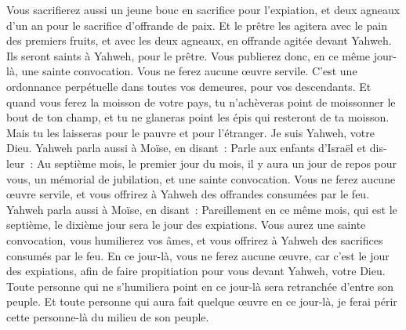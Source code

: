 \begin{multicols}{2}
Vous sacrifierez aussi un jeune bouc en sacrifice pour l'expiation, et deux agneaux d'un an pour le sacrifice d'offrande de paix.
Et le prêtre les agitera avec le pain des premiers fruits, et avec les deux agneaux, en offrande agitée devant Yahweh. Ils seront saints à Yahweh, pour le prêtre.
Vous publierez donc, en ce même jour-là, une sainte convocation. Vous ne ferez aucune œuvre servile. C'est une ordonnance perpétuelle dans toutes vos demeures, pour vos descendants.
Et quand vous ferez la moisson de votre pays, tu n'achèveras point de moissonner le bout de ton champ, et tu ne glaneras point les épis qui resteront de ta moisson. Mais tu les laisseras pour le pauvre et pour l'étranger. Je suis Yahweh, votre Dieu.
Yahweh parla aussi à Moïse, en disant~:
Parle aux enfants d'Israël et dis-leur~: Au septième mois, le premier jour du mois, il y aura un jour de repos pour vous, un mémorial de jubilation, et une sainte convocation.
Vous ne ferez aucune œuvre servile, et vous offrirez à Yahweh des offrandes consumées par le feu.
Yahweh parla aussi à Moïse, en disant~:
Pareillement en ce même mois, qui est le septième, le dixième jour sera le jour des expiations. Vous aurez une sainte convocation, vous humilierez vos âmes, et vous offrirez à Yahweh des sacrifices consumés par le feu.
En ce jour-là, vous ne ferez aucune œuvre, car c'est le jour des expiations, afin de faire propitiation pour vous devant Yahweh, votre Dieu.
Toute personne qui ne s'humiliera point en ce jour-là sera retranchée d'entre son peuple.
Et toute personne qui aura fait quelque œuvre en ce jour-là, je ferai périr cette personne-là du milieu de son peuple.

\end{multicols}
